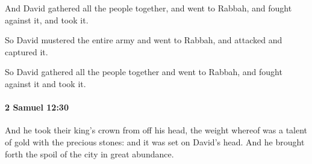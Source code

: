 			\begin{versebox}
					\item[BHS] 
					\item[ASV] And David gathered all the people together, and went to Rabbah, and fought against it, and took it.
					\item[NIV] So David mustered the entire army and went to Rabbah, and attacked and captured it.
					\item[NRSV] So David gathered all the people together and went to Rabbah, and fought against it and took it.
			\end{versebox}

		\paragraph{2 Samuel 12:30} %
			\label{2SAMUEL-12-30}

			And he took their king’s crown from off his head, the weight whereof was a talent of gold with the precious stones: and it was set on David’s head. And he brought forth the spoil of the city in great abundance.

